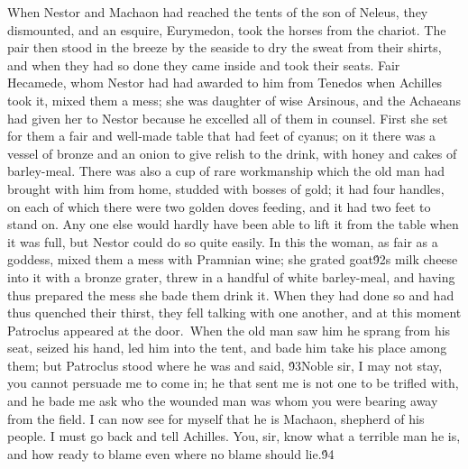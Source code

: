 {When Nestor and Machaon had reached the tents of the son of Neleus, they dismounted, and an esquire, Eurymedon, took the horses from the chariot. The pair then stood in the breeze by the seaside to dry the sweat from their shirts, and when they had so done they came inside and took their seats. Fair Hecamede, whom Nestor had had awarded to him from Tenedos when Achilles took it, mixed them a mess; she was daughter of wise Arsinous, and the Achaeans had given her to Nestor because he excelled all of them in counsel. First she set for them a fair and well-made table that had feet of cyanus; on it there was a vessel of bronze and an onion to give relish to the drink, with honey and cakes of barley-meal. There was also a cup of rare workmanship which the old man had brought with him from home, studded with bosses of gold; it had four handles, on each of which there were two golden doves feeding, and it had two feet to stand on. Any one else would hardly have been able to lift it from the table when it was full, but Nestor could do so quite easily. In this the woman, as fair as a goddess, mixed them a mess with Pramnian wine; she grated goat\'92s milk cheese into it with a bronze grater, threw in a handful of white barley-meal, and having thus prepared the mess she bade them drink it. When they had done so and had thus quenched their thirst, they fell talking with one another, and at this moment Patroclus appeared at the door.\
When the old man saw him he sprang from his seat, seized his hand, led him into the tent, and bade him take his place among them; but Patroclus stood where he was and said, \'93Noble sir, I may not stay, you cannot persuade me to come in; he that sent me is not one to be trifled with, and he bade me ask who the wounded man was whom you were bearing away from the field. I can now see for myself that he is Machaon, shepherd of his people. I must go back and tell Achilles. You, sir, know what a terrible man he is, and how ready to blame even where no blame should lie.\'94\
}
